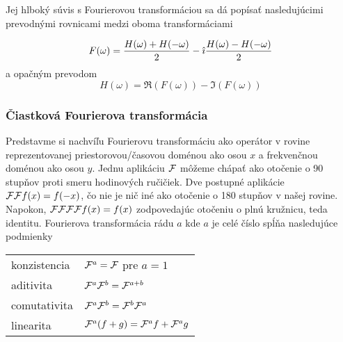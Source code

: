 Jej hlboký súvis s Fourierovou transformáciou sa dá popísať
nasledujúcimi prevodnými rovnicami medzi oboma transformáciami

\begin{equation*}
    F(\omega) = \frac{H(\omega)+H(-\omega)}{2} 
                -\hat{\imath} \frac{H(\omega) - H(-\omega)}{2}
\end{equation*}
a opačným prevodom
\begin{equation*}
 H(\omega) = \Re(F(\omega)) - \Im(F(\omega))
\end{equation*}

\subsubsection{Čiastková Fourierova transformácia}
Predstavme si nachvíľu Fourierovu transformáciu ako operátor
v rovine reprezentovanej priestorovou/časovou doménou ako osou $x$ a
frekvenčnou doménou ako osou $y$.
Jednu aplikáciu $\mathcal{F}$ môžeme chápať ako otočenie o 90 stupňov
proti smeru hodinových ručičiek.
Dve postupné aplikácie $\mathcal{F}\mathcal{F} f(x) = f(-x)$, čo nie je nič
iné ako otočenie o 180 stupňov v našej rovine. Napokon,
$\mathcal{F}\mathcal{F}\mathcal{F}\mathcal{F} f(x) = f(x)$ zodpovedajúc otočeniu o
plnú kružnicu, teda identitu.
Fourierova transformácia rádu $a$ kde $a$ je celé číslo spĺňa
nasledujúce podmienky \\
\begin{tabular}{l l}
    konzistencia& $\mathcal{F}^a = \mathcal{F}$ pre $a=1$ \\
    aditivita& $\mathcal{F}^a \mathcal{F}^b = \mathcal{F}^{a+b}$ \\
    comutativita & $\mathcal{F}^a \mathcal{F}^b = \mathcal{F}^b \mathcal{F}^a$ \\
    linearita& $\mathcal{F}^a(f+g) = \mathcal{F}^a f + \mathcal{F}^a g$
\end{tabular}


